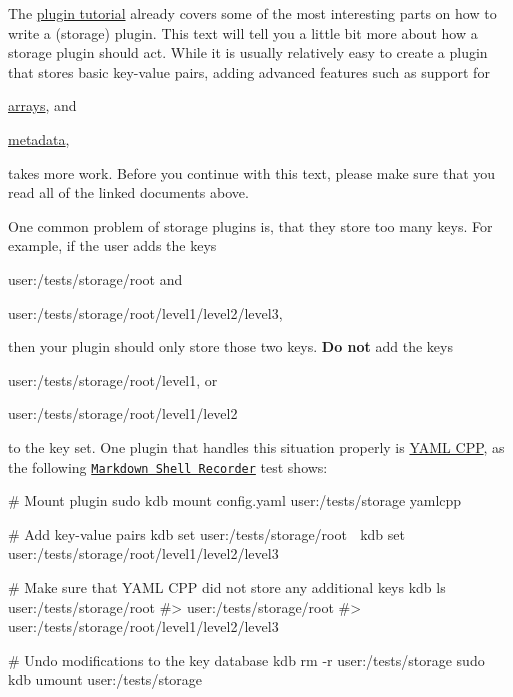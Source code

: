 The \hyperlink{doc_tutorials_plugins_md}{plugin tutorial} already covers some of the most interesting parts on how to write a (storage) plugin. This text will tell you a little bit more about how a storage plugin should act. While it is usually relatively easy to create a plugin that stores basic key-\/value pairs, adding advanced features such as support for


\begin{DoxyItemize}
\item \hyperlink{doc_tutorials_arrays_md}{arrays}, and
\item \hyperlink{doc_dev_metadata_md}{metadata},
\end{DoxyItemize}

takes more work. Before you continue with this text, please make sure that you read all of the linked documents above.

One common problem of storage plugins is, that they store too many keys. For example, if the user adds the keys


\begin{DoxyItemize}
\item {\ttfamily user\+:/tests/storage/root} and
\item {\ttfamily user\+:/tests/storage/root/level1/level2/level3},
\end{DoxyItemize}

then your plugin should only store those two keys. {\bfseries Do not} add the keys


\begin{DoxyItemize}
\item {\ttfamily user\+:/tests/storage/root/level1}, or
\item {\ttfamily user\+:/tests/storage/root/level1/level2}
\end{DoxyItemize}

to the key set. One plugin that handles this situation properly is \hyperlink{autotoc_md817_src_plugins_yamlcpp_README_md}{Y\+A\+ML C\+PP}, as the following \href{https://master.libelektra.org/tests/shell/shell_recorder/tutorial_wrapper}{\tt Markdown Shell Recorder} test shows\+:


\begin{DoxyCode}
# Mount plugin
sudo kdb mount config.yaml user:/tests/storage yamlcpp

# Add key-value pairs
kdb set user:/tests/storage/root 🐓
kdb set user:/tests/storage/root/level1/level2/level3 🐣

# Make sure that YAML CPP did not store any additional keys
kdb ls user:/tests/storage/root
#> user:/tests/storage/root
#> user:/tests/storage/root/level1/level2/level3

# Undo modifications to the key database
kdb rm -r user:/tests/storage
sudo kdb umount user:/tests/storage
\end{DoxyCode}


